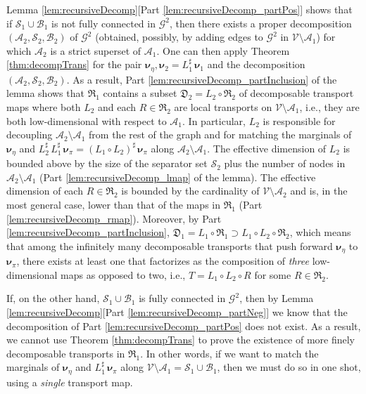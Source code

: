 \documentclass[twoside,11pt]{article}
\newcommand{\genm}{\boldsymbol{\nu} }   %
\newcommand{\Bc}{\mathcal{B}}
\newcommand{\Vc}{\mathcal{V}}
\newcommand{\Ac}{\mathcal{A}}
\newcommand{\Sc}{\mathcal{S}}
\newcommand{\Gcb}{\boldsymbol{\mathcal{G}}}
\newcommand{\lmap}{L} %
\newcommand{\decset}{\mathfrak{D}} %
\newcommand{\Aset}{ \Ac }
\newcommand{\Bset}{ \Bc }
\newcommand{\Sset}{ \Sc }
\newcommand{\pull}{^\sharp}
\begin{document}
%
Lemma \ref{lem:recursiveDecomp}[Part \ref{lem:recursiveDecomp_partPos}]
shows that if $\Sset_1 \cup \Bset_1$  is not
fully connected in $\Gcb^2$, then
there exists a
proper decomposition $(\Aset_2,\Sset_2,\Bset_2)$ of $\Gcb^2$ (obtained, possibly, by adding edges to $\Gcb^2$ in
$\Vc \setminus \Aset_1$) for which $\Aset_2$ is a strict superset of $\Aset_1$.
One can then apply Theorem \ref{thm:decompTrans}
for the pair  $\genm_\eta , \genm_{2} = \lmap_1\pull \,\genm_1$ and the
decomposition 
$(\Aset_{2},\Sset_{2},\Bset_{2})$.
As a result, Part \ref{lem:recursiveDecomp_partInclusion} of the lemma shows that
%
$\mathfrak{R}_1$ contains a subset 
$\decset_2 = \lmap_2 \circ \mathfrak{R}_2$ of decomposable
transport maps where both $\lmap_2$ and each $R \in \mathfrak{R}_2$ are
local transports on $\Vc \setminus \Aset_1$, i.e., they are both
low-dimensional with respect to $\Aset_1$. 
%
%
%
%
%
%
In particular, $\lmap_2$ is
responsible for decoupling $\Aset_{2}\setminus \Aset_{1}$ from the
rest of the graph and for matching the marginals of $\genm_\eta$ and
$\lmap_2 \pull\,\lmap_1 \pull \, \genm_\pi = (\lmap_1 \circ \lmap_2)\pull \,
\genm_\pi $ along $\Aset_{2}\setminus \Aset_{1}$.  The effective dimension
of $\lmap_2$ is bounded above by the size of the 
%
separator
set $\Sset_2$ plus the number of 
nodes in $\Aset_2 \setminus \Aset_1$
(Part \ref{lem:recursiveDecomp_lmap}
of the lemma). 
The effective dimension of each
$R \in \mathfrak{R}_2$ is bounded by the cardinality of
$\Vc \setminus \Aset_2$ and is, in the most general case, lower than
that of the maps in $\mathfrak{R}_1$ (Part \ref{lem:recursiveDecomp_rmap}).
%
%
Moreover, by Part
\ref{lem:recursiveDecomp_partInclusion},
%
$\decset_1 = \lmap_1 \circ \mathfrak{R}_1 \supset 
\lmap_1 \circ \lmap_{2} \circ \mathfrak{R}_{2}$, which means that among 
the infinitely many decomposable transports that push forward 
$\genm_\eta$ to $\genm_\pi$, there 
exists at least one that factorizes as the composition of
\textit{three} low-dimensional maps as opposed to two, i.e., $T=\lmap_1 \circ \lmap_2 \circ R$ for some
$R \in \mathfrak{R}_{2}$.
%

If, on the other hand, 
$\Sset_1 \cup \Bset_1$  is  
fully connected in $\Gcb^2$,
%
%
then by Lemma \ref{lem:recursiveDecomp}[Part \ref{lem:recursiveDecomp_partNeg}] 
we know that 
the decomposition of Part \ref{lem:recursiveDecomp_partPos}
%
%
does not exist.
%
%
%
%
%
As a result, we cannot use Theorem \ref{thm:decompTrans} to prove the
existence of more finely decomposable transports in $\mathfrak{R}_{1}$.
In other words, if we want to match the marginals of $\genm_\eta$ and 
$\lmap_1\pull\,\genm_\pi$ 
along $\Vc \setminus \Ac_1 = \Sset_1 \cup \Bset_1$, then 
we must do so in one shot, using a {\it single} transport map.
%
%
%
%
%
%
%
\end{document}
